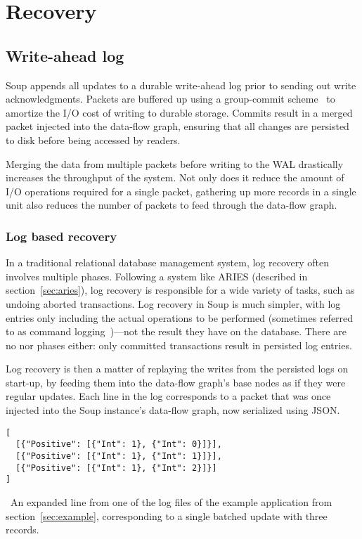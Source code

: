 \chapter{Recovery}

\section{Write-ahead log}

Soup appends all updates to a durable write-ahead log prior to sending out write
acknowledgments. Packets are buffered up using a group-commit
scheme~\cite{main-memory} to amortize the I/O cost of writing to durable
storage. Commits result in a merged packet injected into the data-flow graph,
ensuring that all changes are persisted to disk before being accessed by
readers.

Merging the data from multiple packets before writing to the WAL drastically
increases the throughput of the system. Not only does it reduce the amount of
I/O operations required for a single packet, gathering up more records in a
single unit also reduces the number of packets to feed through the data-flow graph.


\subsection{Log based recovery}

In a traditional relational database management system, log recovery often
involves multiple phases. Following a system like ARIES (described in
section~\ref{sec:aries}), log recovery is responsible for a wide variety of
tasks, such as undoing aborted transactions. Log recovery in Soup is much
simpler, with log entries only including the actual operations to be performed
(sometimes referred to as command logging~\cite{voltdb-recovery})---not the
result they have on the database. There are no  nor 
phases either: only committed transactions result in persisted log entries.

Log recovery is then a matter of replaying the writes from the persisted logs on
start-up, by feeding them into the data-flow graph's base nodes as if they were
regular updates. Each line in the log corresponds to a packet that was once
injected into the Soup instance's data-flow graph, now serialized using JSON.\@

\begin{listing}[H]
  \begin{verbatim}
[
  [{"Positive": [{"Int": 1}, {"Int": 0}]}],
  [{"Positive": [{"Int": 1}, {"Int": 1}]}],
  [{"Positive": [{"Int": 1}, {"Int": 2}]}]
]
  \end{verbatim}
  \caption{\
    An expanded line from one of the log files of the example application from
    section~\ref{sec:example}, corresponding to a single batched update with
    three records.
  }\label{lst:log-entry}
\end{listing}


